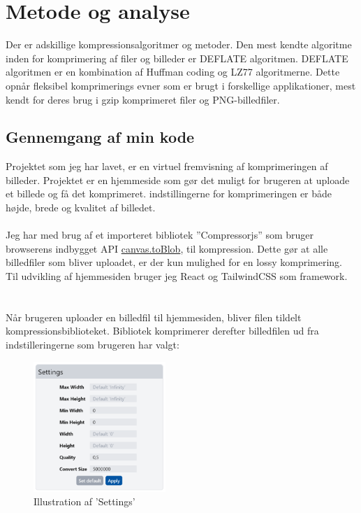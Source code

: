 \documentclass[12pt]{article}
\begin{document}
\section{Metode og analyse}
Der er adskillige kompressionsalgoritmer og metoder. Den mest kendte algoritme inden for komprimering af filer og billeder er DEFLATE algoritmen. 
DEFLATE algoritmen er en kombination af Huffman coding og LZ77 algoritmerne. Dette opnår fleksibel komprimerings evner som er brugt i forskellige applikationer, 
mest kendt for deres brug i gzip komprimeret filer og PNG-billedfiler.
\subsection{Gennemgang af min kode}
Projektet som jeg har lavet, er en virtuel fremvisning af komprimeringen af billeder.\cite{github} Projektet er en hjemmeside som gør det muligt for brugeren at uploade et billede og få det komprimeret. 
indstillingerne for komprimeringen er både højde, brede og kvalitet af billedet. \\\\
Jeg har med brug af et importeret bibliotek ”Compressorjs”\cite{Compressorjs} som bruger browserens indbygget API \href{https://developer.mozilla.org/en-US/docs/Web/API/HTMLCanvasElement/toBlob}{canvas.toBlob}, til kompression. 
Dette gør at alle billedfiler som bliver uploadet, er der kun mulighed for en lossy komprimering. Til udvikling af hjemmesiden bruger jeg React og TailwindCSS som framework. \\\\\\
Når brugeren uploader en billedfil til hjemmesiden, bliver filen tildelt kompressionsbiblioteket. Bibliotek komprimerer derefter billedfilen ud fra indstilleringerne som brugeren har valgt:\\
\noindent\begin{minipage}{.4\textwidth}
  \begin{figure}[H]
    \centering
    \includegraphics[width=5cm]{2.png}%
    \caption{\centering Illustration af 'Settings'}%
  \end{figure}
  \end{minipage}\hfill
\end{document}
